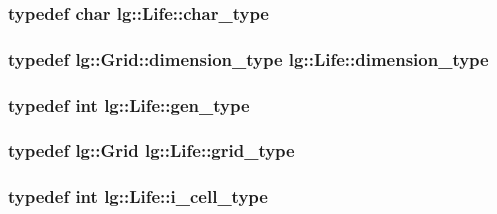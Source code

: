 \subsubsection[{\texorpdfstring{char\+\_\+type}{char_type}}]{\setlength{\rightskip}{0pt plus 5cm}typedef char {\bf lg\+::\+Life\+::char\+\_\+type}}\hypertarget{classlg_1_1Life_a9d2980d7a77c0b01c639a013765869db}{}\label{classlg_1_1Life_a9d2980d7a77c0b01c639a013765869db}
\subsubsection[{\texorpdfstring{dimension\+\_\+type}{dimension_type}}]{\setlength{\rightskip}{0pt plus 5cm}typedef {\bf lg\+::\+Grid\+::dimension\+\_\+type} {\bf lg\+::\+Life\+::dimension\+\_\+type}}\hypertarget{classlg_1_1Life_a05357ceab438f920c6f3dbdde93f28be}{}\label{classlg_1_1Life_a05357ceab438f920c6f3dbdde93f28be}
\subsubsection[{\texorpdfstring{gen\+\_\+type}{gen_type}}]{\setlength{\rightskip}{0pt plus 5cm}typedef int {\bf lg\+::\+Life\+::gen\+\_\+type}}\hypertarget{classlg_1_1Life_a31abf1588df7f6f299cadce0ab6da9f9}{}\label{classlg_1_1Life_a31abf1588df7f6f299cadce0ab6da9f9}
\subsubsection[{\texorpdfstring{grid\+\_\+type}{grid_type}}]{\setlength{\rightskip}{0pt plus 5cm}typedef {\bf lg\+::\+Grid} {\bf lg\+::\+Life\+::grid\+\_\+type}}\hypertarget{classlg_1_1Life_ac1ca0328d97e90476808cb39eb0a9959}{}\label{classlg_1_1Life_ac1ca0328d97e90476808cb39eb0a9959}
\subsubsection[{\texorpdfstring{i\+\_\+cell\+\_\+type}{i_cell_type}}]{\setlength{\rightskip}{0pt plus 5cm}typedef int {\bf lg\+::\+Life\+::i\+\_\+cell\+\_\+type}}\hypertarget{classlg_1_1Life_a35201ae72bdab2eb51e6d9782b48a920}{}\label{classlg_1_1Life_a35201ae72bdab2eb51e6d9782b48a920}
